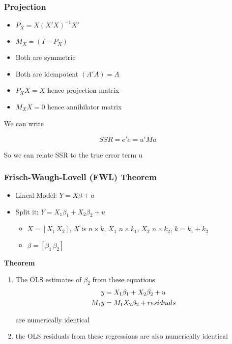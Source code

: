 \documentclass[
  shownotes,
  xcolor={svgnames},
  hyperref={colorlinks,citecolor=DarkBlue,linkcolor=DarkRed,urlcolor=DarkBlue}
  ]{beamer}
\begin{document}
\begin{frame}
\frametitle{Projection}

\begin{itemize}
\item $P_X=X(X'X)^{-1}X'$ 
\item $M_X=(I-P_X)$
\end{itemize}

\begin{itemize}
  \item Both are symmetric
  \item Both are idempotent $(A'A)=A$
  \item $P_XX=X$ hence projection matrix
  \item $M_XX=0$ hence annihilator matrix
\end{itemize}

We can write

\begin{align}
SSR = e'e = u'Mu
\end{align}

So we can relate SSR to the true error term u
\end{frame}
\begin{frame}
\frametitle{Frisch-Waugh-Lovell (FWL) Theorem}
\begin{itemize}
\item Lineal Model: $Y=X\beta +u$
\item Split it: $Y=X_1 \beta_1 + X_2 \beta_2 +u$
  \begin{itemize}
    \footnotesize
  \item $X=[X_1\,X_2]$, $X$ is $n\times k$, $X_1$ $n\times k_1$, $X_2$ $n\times k_2$, $k=k_1+k_2$
  \item $\beta = [\beta_1 \, \beta_2]$ 
  \end{itemize}
\end{itemize}


{\bf Theorem}
\begin{enumerate}
  \item The OLS estimates of $\beta_2$ from these equations
  \begin{align}
  y &= X_1 \beta_1 +X_2 \beta_2 +u  \\
  \medskip
  M_1y &= M_1X_2 \beta_2 + residuals 
  \end{align}

  are numerically identical
  \bigskip
  \item the OLS residuals from these regressions are also numerically identical
\end{enumerate}


\end{frame}
\end{document}
